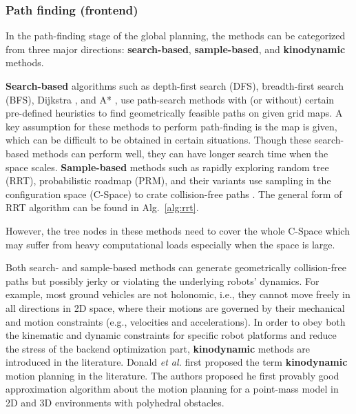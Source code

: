\documentclass[letterpaper,journal,twoside]{IEEEtran}
\newcommand{\TB}[1]{\textbf{#1}}
\newcommand{\etal}{\textit{et al.}}
\begin{document}
\subsubsection{Path finding (frontend)}

In the path-finding stage of the global planning, 
the methods can be categorized 
from three major directions: \TB{search-based}, 
\TB{sample-based}, and \TB{kinodynamic} methods. 


% 
\TB{Search-based} algorithms such as depth-first 
search (DFS), breadth-first search (BFS), 
Dijkstra \cite{wang2011application}, and 
A* \cite{hart1968formal}, use path-search methods 
with (or without) certain pre-defined heuristics to find 
geometrically feasible paths on given grid maps. 
A key assumption for these methods to perform path-finding 
is the map is given, which can be difficult to be obtained 
in certain situations. 
Though these search-based methods can perform well, they 
can have longer search time when the space scales.
\TB{Sample-based} methods such as rapidly exploring random 
tree (RRT), probabilistic roadmap (PRM), and their 
variants use sampling in the configuration space (C-Space) 
to crate collision-free paths \cite{lavalle2001rapidly,
karaman2011sampling,kavraki1996probabilistic}. 
The general form of RRT algorithm can be found in 
Alg.~\ref{alg:rrt}.

However, the tree nodes in these methods need to cover the 
whole C-Space which may suffer from heavy computational 
loads especially when the space is large.  

Both search- and sample-based methods can generate 
geometrically collision-free paths but possibly jerky or 
violating the underlying robots' dynamics.
For example, most ground vehicles are not 
holonomic, i.e., they cannot move freely in all directions 
in 2D space, where their motions are governed by their 
mechanical and motion constraints (e.g., velocities and 
accelerations).
In order to obey both the kinematic and dynamic 
constraints for specific
robot platforms and reduce the stress of the backend 
optimization part, \TB{kinodynamic} methods are introduced
in the literature. 
Donald \etal \cite{donald1993kinodynamic} first proposed 
the term \TB{kinodynamic} motion planning in the literature.
The authors proposed he first provably good approximation 
algorithm about the motion planning for a point-mass model 
in 2D and 3D environments with polyhedral obstacles.
\end{document}
